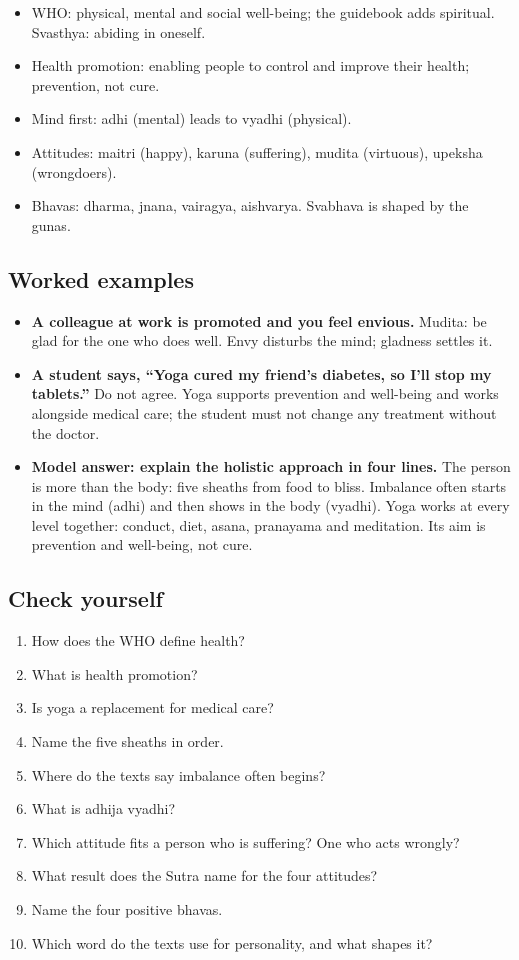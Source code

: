 \begin{recall}
\begin{itemize}
\item WHO: physical, mental and social well-being; the guidebook adds spiritual. Svasthya: abiding in oneself.
\item Health promotion: enabling people to control and improve their health; prevention, not cure.
\item Mind first: adhi (mental) leads to vyadhi (physical).
\item Attitudes: maitri (happy), karuna (suffering), mudita (virtuous), upeksha (wrongdoers).
\item Bhavas: dharma, jnana, vairagya, aishvarya. Svabhava is shaped by the gunas.
\end{itemize}
\end{recall}

\subsection*{Worked examples}
\begin{itemize}
\item \textbf{A colleague at work is promoted and you feel envious.} Mudita: be glad for the one who does well. Envy disturbs the mind; gladness settles it.
\item \textbf{A student says, ``Yoga cured my friend's diabetes, so I'll stop my tablets.''} Do not agree. Yoga supports prevention and well-being and works alongside medical care; the student must not change any treatment without the doctor.
\item \textbf{Model answer: explain the holistic approach in four lines.} The person is more than the body: five sheaths from food to bliss. Imbalance often starts in the mind (adhi) and then shows in the body (vyadhi). Yoga works at every level together: conduct, diet, asana, pranayama and meditation. Its aim is prevention and well-being, not cure.
\end{itemize}

\subsection*{Check yourself}
\begin{enumerate}
\item How does the WHO define health?
\item What is health promotion?
\item Is yoga a replacement for medical care?
\item Name the five sheaths in order.
\item Where do the texts say imbalance often begins?
\item What is adhija vyadhi?
\item Which attitude fits a person who is suffering? One who acts wrongly?
\item What result does the Sutra name for the four attitudes?
\item Name the four positive bhavas.
\item Which word do the texts use for personality, and what shapes it?
\end{enumerate}

